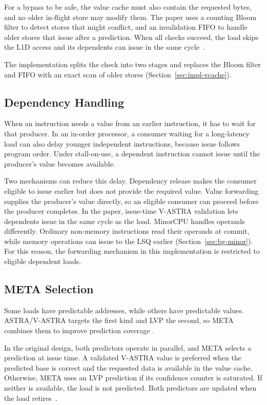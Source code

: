 For a bypass to be safe, the value cache must also contain the
requested bytes, and no older in-flight store may modify them. The
paper uses a counting Bloom filter to detect stores that might
conflict, and an invalidation FIFO to handle older stores that
issue after a prediction. When all checks succeed, the load skips
the L1D access and its dependents can issue in the same cycle~\cite{ravenel2025architecting}.

The implementation splits the check into two stages and replaces the Bloom
filter and FIFO with an exact scan of older stores
(Section~\ref{sec:impl-vcache}).

\subsection{Dependency Handling}

When an instruction needs a value from an earlier instruction, it
has to wait for that producer. In an in-order processor,
a consumer waiting for a long-latency load can also delay younger
independent instructions, because issue follows program order. Under
stall-on-use, a dependent instruction cannot issue until the
producer's value becomes available.

Two mechanisms can reduce this delay. Dependency release
makes the consumer eligible to issue earlier but does not provide
the required value. Value forwarding supplies the producer's
value directly, so an eligible consumer can proceed before the
producer completes. In the paper, issue-time V-ASTRA validation
lets dependents issue in the same cycle as the load. MinorCPU
handles operands differently. Ordinary non-memory instructions read
their operands at commit, while memory operations can issue to
the LSQ earlier (Section~\ref{sec:bg-minor}). For this reason, the
forwarding mechanism in this implementation is restricted to eligible
dependent loads.

\subsection{META Selection}

Some loads have predictable addresses, while others have predictable
values. ASTRA/V-ASTRA targets the first kind and LVP the second, so
META combines them to improve
prediction coverage \cite{ravenel2025architecting}.

In the original design, both predictors operate in parallel, and
META selects a prediction at issue time. A validated V-ASTRA value
is preferred when the predicted base is correct and the requested
data is available in the value cache. Otherwise, META uses an
LVP prediction if its confidence counter is saturated. If neither
is available, the load is not predicted. Both predictors are updated
when the load retires~\cite{ravenel2025architecting}.

